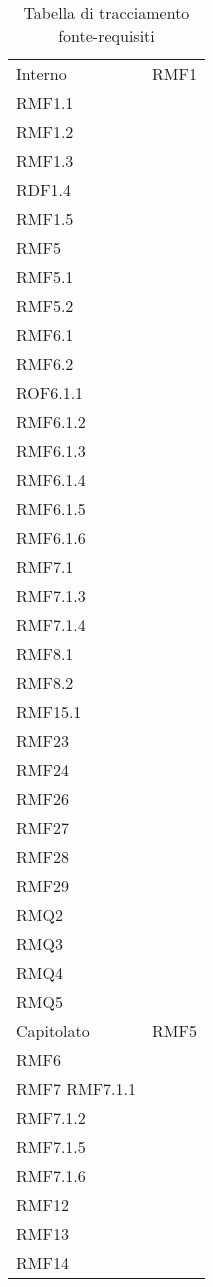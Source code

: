 \setlength{\tabcolsep}{10pt}
\begin{longtable}[h!] { >{\centering}m{5cm} >{\centering}m{5cm} }
	\caption{Tabella di tracciamento fonte-requisiti} \\
	\rowcolor{lightgray}
	\thead{Fonte} & \thead{Requisiti} \\ \endhead%


	 Interno & RMF1 \\
	 RMF1.1 \\
	 RMF1.2 \\
	 RMF1.3 \\
	 RDF1.4 \\
	 RMF1.5 \\
	 RMF5 \\
	 RMF5.1 \\
	 RMF5.2 \\
	 RMF6.1 \\
	 RMF6.2 \\
	 ROF6.1.1 \\
	 RMF6.1.2 \\
	 RMF6.1.3 \\
	 RMF6.1.4 \\
	 RMF6.1.5 \\
	 RMF6.1.6 \\
	 RMF7.1 \\
	 RMF7.1.3 \\
	 RMF7.1.4 \\
	 RMF8.1 \\
	 RMF8.2 \\
	 RMF15.1 \\
	 RMF23 \\
	 RMF24 \\
	 RMF26 \\
	 RMF27 \\
	 RMF28 \\
	 RMF29 \\
	 RMQ2 \\
	 RMQ3 \\
	 RMQ4 \\
	 RMQ5
	 \tabularnewline
	 Capitolato & RMF5 \\
	 RMF6 \\
	 RMF7
	 RMF7.1.1\\
	 RMF7.1.2 \\
	 RMF7.1.5 \\
	 RMF7.1.6 \\
	 RMF12 \\
	 RMF13 \\
	 RMF14 \\

\end{longtable}
